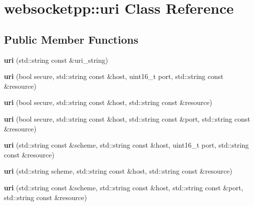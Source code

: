 \hypertarget{classwebsocketpp_1_1uri}{}\section{websocketpp\+:\+:uri Class Reference}
\label{classwebsocketpp_1_1uri}
\subsection*{Public Member Functions}
\begin{DoxyCompactItemize}
\item 
{\bfseries uri} (std\+::string const \&uri\+\_\+string)\hypertarget{classwebsocketpp_1_1uri_a8cb22ae92e3e49c4351a3f873a9b279d}{}\label{classwebsocketpp_1_1uri_a8cb22ae92e3e49c4351a3f873a9b279d}

\item 
{\bfseries uri} (bool secure, std\+::string const \&host, uint16\+\_\+t port, std\+::string const \&resource)\hypertarget{classwebsocketpp_1_1uri_a3c133d45cf2ebb1859e7113b2b9d44b3}{}\label{classwebsocketpp_1_1uri_a3c133d45cf2ebb1859e7113b2b9d44b3}

\item 
{\bfseries uri} (bool secure, std\+::string const \&host, std\+::string const \&resource)\hypertarget{classwebsocketpp_1_1uri_ae7bfd18657c73695a4ff58318e02066a}{}\label{classwebsocketpp_1_1uri_ae7bfd18657c73695a4ff58318e02066a}

\item 
{\bfseries uri} (bool secure, std\+::string const \&host, std\+::string const \&port, std\+::string const \&resource)\hypertarget{classwebsocketpp_1_1uri_a0d1197614a15afedca9fdfd1bfef3d85}{}\label{classwebsocketpp_1_1uri_a0d1197614a15afedca9fdfd1bfef3d85}

\item 
{\bfseries uri} (std\+::string const \&scheme, std\+::string const \&host, uint16\+\_\+t port, std\+::string const \&resource)\hypertarget{classwebsocketpp_1_1uri_a9019b4a2e3de42a822f2e37baa332c9e}{}\label{classwebsocketpp_1_1uri_a9019b4a2e3de42a822f2e37baa332c9e}

\item 
{\bfseries uri} (std\+::string scheme, std\+::string const \&host, std\+::string const \&resource)\hypertarget{classwebsocketpp_1_1uri_a2cf8998d357854ed3ce5fd8cb38742a5}{}\label{classwebsocketpp_1_1uri_a2cf8998d357854ed3ce5fd8cb38742a5}

\item 
{\bfseries uri} (std\+::string const \&scheme, std\+::string const \&host, std\+::string const \&port, std\+::string const \&resource)\hypertarget{classwebsocketpp_1_1uri_a162349184bbc29a4d30f6fc50969e6e6}{}\label{classwebsocketpp_1_1uri_a162349184bbc29a4d30f6fc50969e6e6}


\end{DoxyCompactItemize}
